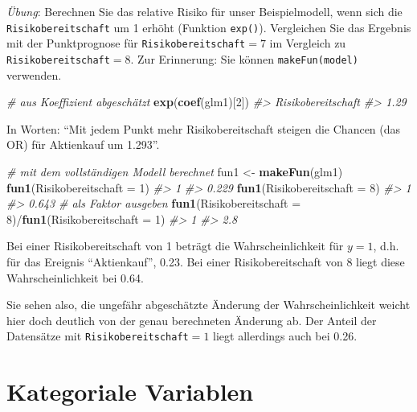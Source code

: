 \documentclass[12pt,ngerman,]{book}
\newenvironment{Shaded}{\begin{snugshade}}{\end{snugshade}}
\newcommand{\KeywordTok}[1]{\textcolor[rgb]{0.13,0.29,0.53}{\textbf{{#1}}}}
\newcommand{\DataTypeTok}[1]{\textcolor[rgb]{0.13,0.29,0.53}{{#1}}}
\newcommand{\DecValTok}[1]{\textcolor[rgb]{0.00,0.00,0.81}{{#1}}}
\newcommand{\StringTok}[1]{\textcolor[rgb]{0.31,0.60,0.02}{{#1}}}
\newcommand{\CommentTok}[1]{\textcolor[rgb]{0.56,0.35,0.01}{\textit{{#1}}}}
\newcommand{\NormalTok}[1]{{#1}}
\renewenvironment{Shaded}{\begin{kframe}}{\end{kframe}}
\begin{document}
\emph{Übung}: Berechnen Sie das relative Risiko für unser
Beispielmodell, wenn sich die \texttt{Risikobereitschaft} um 1 erhöht
(Funktion \texttt{exp()}). Vergleichen Sie das Ergebnis mit der
Punktprognose für \texttt{Risikobereitschaft}\(=7\) im Vergleich zu
\texttt{Risikobereitschaft}\(=8\). Zur Erinnerung: Sie können
\texttt{makeFun(model)} verwenden.

\begin{Shaded}
\begin{Highlighting}[]
\CommentTok{# aus Koeffizient abgeschätzt}
\KeywordTok{exp}\NormalTok{(}\KeywordTok{coef}\NormalTok{(glm1)[}\DecValTok{2}\NormalTok{])}
\CommentTok{#> Risikobereitschaft }
\CommentTok{#>               1.29}
\end{Highlighting}
\end{Shaded}

In Worten: ``Mit jedem Punkt mehr Risikobereitschaft steigen die Chancen
(das OR) für Aktienkauf um 1.293''.

\begin{Shaded}
\begin{Highlighting}[]

\CommentTok{# mit dem vollständigen Modell berechnet}
\NormalTok{fun1 <-}\StringTok{ }\KeywordTok{makeFun}\NormalTok{(glm1)}
\KeywordTok{fun1}\NormalTok{(}\DataTypeTok{Risikobereitschaft =} \DecValTok{1}\NormalTok{)}
\CommentTok{#>     1 }
\CommentTok{#> 0.229}
\KeywordTok{fun1}\NormalTok{(}\DataTypeTok{Risikobereitschaft =} \DecValTok{8}\NormalTok{)}
\CommentTok{#>     1 }
\CommentTok{#> 0.643}
\CommentTok{# als Faktor ausgeben}
\KeywordTok{fun1}\NormalTok{(}\DataTypeTok{Risikobereitschaft =} \DecValTok{8}\NormalTok{)/}\KeywordTok{fun1}\NormalTok{(}\DataTypeTok{Risikobereitschaft =} \DecValTok{1}\NormalTok{)}
\CommentTok{#>   1 }
\CommentTok{#> 2.8}
\end{Highlighting}
\end{Shaded}

Bei einer Risikobereitschaft von 1 beträgt die Wahrscheinlichkeit für
\(y=1\), d.h. für das Ereignis ``Aktienkauf'', 0.23. Bei einer
Risikobereitschaft von 8 liegt diese Wahrscheinlichkeit bei 0.64.

Sie sehen also, die ungefähr abgeschätzte Änderung der
Wahrscheinlichkeit weicht hier doch deutlich von der genau berechneten
Änderung ab. Der Anteil der Datensätze mit
\texttt{Risikobereitschaft}\(=1\) liegt allerdings auch bei 0.26.

\section{Kategoriale Variablen}\label{kategoriale-variablen}
\end{document}
